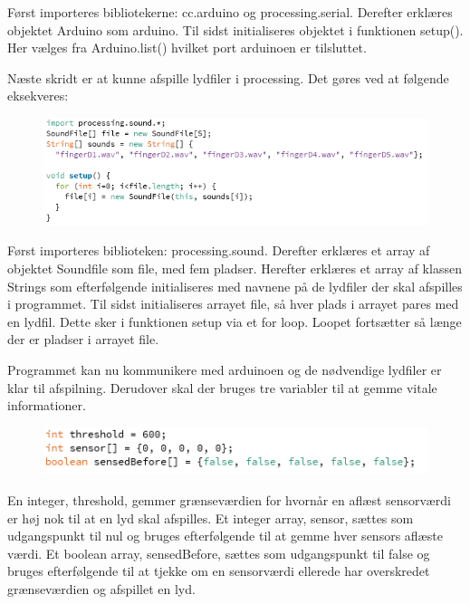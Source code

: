 Først importeres bibliotekerne: cc.arduino og processing.serial.
Derefter erklæres objektet Arduino som arduino. 
Til sidst initialiseres objektet i funktionen setup(). Her vælges fra Arduino.list() hvilket port arduinoen er tilsluttet. 

Næste skridt er at kunne afspille lydfiler i processing. Det gøres ved at følgende eksekveres:

\begin{figure}[H]
\includegraphics[scale=0.8]{Figure/programkode02.png}
\end{figure}  
 
Først importeres biblioteken: processing.sound.
Derefter erklæres et array af objektet Soundfile som file, med fem pladser.
Herefter erklæres et array af klassen Strings som efterfølgende initialiseres med navnene på de lydfiler der skal afspilles i programmet.
Til sidst initialiseres arrayet file, så hver plads i arrayet pares med en lydfil. Dette sker i funktionen setup via et for loop. Loopet fortsætter så længe der er pladser i arrayet file. 

   
Programmet kan nu kommunikere med arduinoen og de nødvendige lydfiler er klar til afspilning. Derudover skal der bruges tre variabler til at gemme vitale informationer. 

\begin{figure}[H]
\includegraphics[scale=0.8]{Figure/programkode03.png}
\end{figure}  

En integer, threshold, gemmer grænseværdien for hvornår en aflæst sensorværdi er høj nok til at en lyd skal afspilles. 
Et integer array, sensor, sættes som udgangspunkt til nul og bruges efterfølgende til at gemme hver sensors aflæste værdi. 
Et boolean array, sensedBefore, sættes som udgangspunkt til false og bruges efterfølgende til at tjekke om en sensorværdi ellerede har overskredet grænseværdien og afspillet en lyd. 
 

